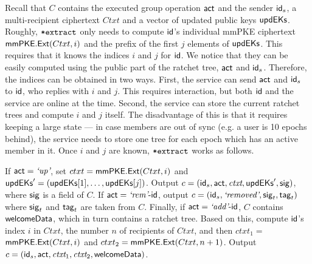 

Recall that $C$ contains the executed group operation $\mathsf{act}$ and the sender ${\mathsf{id}}_s$, a multi-recipient ciphertext $Ctxt$ and a vector of updated public keys ${\mathsf{updEKs}}$. Roughly, ${\textnormal{\tt*extract}}$ only needs to compute ${\mathsf{id}}$'s individual mmPKE ciphertext ${\mathsf{mmPKE}}.{\mathsf{Ext}}(Ctxt, i)$ and the prefix of the first $j$ elements of ${\mathsf{updEKs}}$. This requires that it knows the indices $i$ and $j$ for ${\mathsf{id}}$.
%
We notice that they can be easily computed using the public part of the ratchet tree, $\mathsf{act}$ and ${\mathsf{id}}_s$. Therefore, the indices can be obtained in two ways. First, the service can send $\mathsf{act}$ and ${\mathsf{id}}_s$ to ${\mathsf{id}}$, who replies with $i$ and $j$.  This requires interaction, but both ${\mathsf{id}}$ and the service are online at the time. Second, the service can store the current ratchet trees and compute $i$ and $j$ itself. The disadvantage of this is that it requires keeping a large state --- in case members are out of sync (e.g. a user is 10 epochs behind), the service needs to store one tree for each epoch which has an active member in it.
%
Once $i$ and $j$ are known, ${\textnormal{\tt*extract}}$ works as follows.

If $\mathsf{act} = {\text{\normalfont \it`up'}}$, set  $ctxt = {\mathsf{mmPKE}}.{\mathsf{Ext}}(Ctxt, i)$ and ${\mathsf{updEKs}}' = ({\mathsf{updEKs}}[1], \dots, {\mathsf{updEKs}}[j])$. Output $c =  ({\mathsf{id}}_s, \mathsf{act}, {\normalfont\textit{ctxt}},\allowbreak  {\ensuremath{\mathsf{updEKs}}}',\allowbreak  {\ensuremath{\mathsf{sig}}})$, where ${\mathsf{sig}}$ is a field of $C$. If $\mathsf{act} = {\text{\normalfont \it`rem'}}\textrm{-}{\ensuremath{\mathsf{id}}}$, output $c =  ({\mathsf{id}}_s, {\text{\normalfont \it`removed'}}, {\mathsf{sig}}_t, {\mathsf{tag}}_t)$ where $ {\mathsf{sig}}_t$ and ${\mathsf{tag}}_t$ are taken from $C$. Finally, if $\mathsf{act} = {\text{\normalfont \it`add'}}\textrm{-}{\ensuremath{\mathsf{id}}}$, $C$ contains $\textnormal{\textsf{welcomeData}}$, which in turn contains a ratchet tree. Based on this, compute ${\mathsf{id}}$'s index $i$ in $Ctxt$,  the number $n$ of recipients of $Ctxt$, and then $ctxt_1 = $ ${\mathsf{mmPKE}}.{\mathsf{Ext}}(Ctxt, i)$ and $ctxt_2 = {\mathsf{mmPKE}}.{\mathsf{Ext}}(Ctxt, n+1)$. Output $c =  ({\mathsf{id}}_s, \mathsf{act}, {\normalfont\textit{ctxt}}_1,\allowbreak  {\normalfont\textit{ctxt}}_2,\allowbreak  \textnormal{\textsf{welcomeData}})$.

